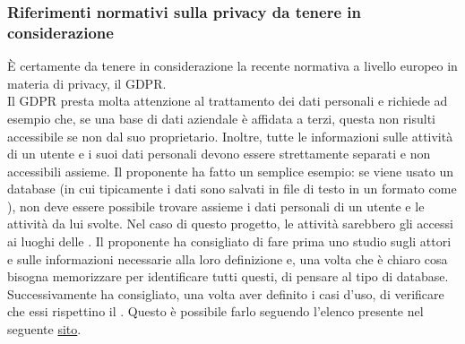 \subsubsection*{Riferimenti normativi sulla privacy da tenere in considerazione}
È certamente da tenere in considerazione la recente normativa a livello europeo in materia di privacy, il GDPR. \\
Il GDPR presta molta attenzione al trattamento dei dati personali e richiede ad esempio che, se una base di dati aziendale è affidata a terzi, questa non risulti accessibile se non dal suo proprietario.
Inoltre, tutte le informazioni sulle attività di un utente e i suoi dati personali devono essere strettamente separati e non accessibili assieme. Il proponente ha fatto un semplice esempio: se viene usato un database
 (in cui tipicamente i dati sono salvati in file di testo in un formato come ), non deve essere possibile trovare assieme i dati personali di un utente e le attività da lui svolte. Nel caso di questo progetto, le attività sarebbero gli accessi ai luoghi delle .
Il proponente ha consigliato di fare prima uno studio sugli attori e sulle informazioni necessarie alla loro definizione e, una volta che è chiaro cosa bisogna memorizzare per identificare tutti questi, di pensare al tipo di database.
Successivamente ha consigliato, una volta aver definito i casi d'uso, di verificare che essi rispettino il . Questo è possibile farlo seguendo l'elenco presente nel seguente \href{https://gdpr.eu/checklist/}{sito}.

